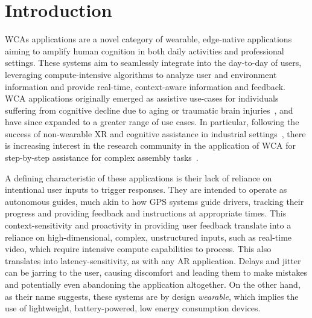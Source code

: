\section{Introduction}\label{sec:intro}

\glspl{WCA} applications are a novel category of wearable, edge-native applications aiming to amplify human cognition in both daily activities and professional settings.
These systems aim to seamlessly integrate into the day-to-day of users, leveraging compute-intensive algorithms to analyze user and environment information and provide real-time, context-aware information and feedback.
\gls{WCA} applications originally emerged as assistive use-cases for individuals suffering from cognitive decline due to aging or traumatic brain injuries~\cite{satyanarayanan2009case,Ha2014towards,Satya2019augmenting}, and have since expanded to a greater range of use cases.
In particular, following the success of non-wearable \gls{XR} and cognitive assistance in industrial settings~\cite{Funk2015Cognitive,Wang2022Comprehensive}, there is increasing interest in the research community in the application of \gls{WCA} for step-by-step assistance for complex assembly tasks~\cite{Chen2017Empirical,belletier2021wearable}.

A defining characteristic of these applications is their lack of reliance on intentional user inputs to trigger responses.
They are intended to operate as autonomous guides, much akin to how \gls{GPS} systems guide drivers, tracking their progress and providing feedback and instructions at appropriate times.
This context-sensitivity and proactivity in providing user feedback translate into a reliance on high-dimensional, complex, unstructured inputs, such as real-time video, which require intensive compute capabilities to process.
This also translates into latency-sensitivity, as with any \gls{AR} application.
Delays and jitter can be jarring to the user, causing discomfort and leading them to make mistakes and potentially even abandoning the application altogether.
On the other hand, as their name suggests, these systems are by design \emph{wearable}, which implies the use of lightweight, battery-powered, low energy consumption devices.


